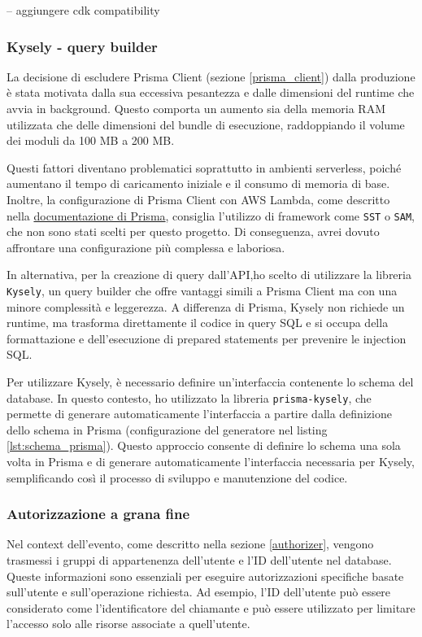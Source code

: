-- aggiungere cdk compatibility

\subsubsection{Kysely - query builder}
\label{Kysely}

\vspace{0,3cm}

La decisione di escludere Prisma Client (sezione \ref{prisma_client}) dalla produzione è stata motivata dalla sua eccessiva pesantezza e dalle dimensioni del runtime che avvia in background. Questo comporta un aumento sia della memoria RAM utilizzata che delle dimensioni del bundle di esecuzione, raddoppiando il volume dei moduli da 100 MB a 200 MB. 

Questi fattori diventano problematici soprattutto in ambienti serverless, poiché aumentano il tempo di caricamento iniziale e il consumo di memoria di base. Inoltre, la configurazione di Prisma Client con AWS Lambda, come descritto nella \href{https://www.prisma.io/docs/orm/prisma-client/deployment/serverless/deploy-to-aws-lambda}{documentazione di Prisma}, consiglia l'utilizzo di framework come \texttt{SST} o \texttt{SAM}, che non sono stati scelti per questo progetto. Di conseguenza, avrei dovuto affrontare una configurazione più complessa e laboriosa.

\vspace{0,3cm}

In alternativa, per la creazione di query dall'API,ho scelto di utilizzare la libreria \texttt{Kysely}, un query builder che offre vantaggi simili a Prisma Client ma con una minore complessità e leggerezza. A differenza di Prisma, Kysely non richiede un runtime, ma trasforma direttamente il codice in query SQL e si occupa della formattazione e dell'esecuzione di prepared statements per prevenire le injection SQL. 

Per utilizzare Kysely, è necessario definire un'interfaccia contenente lo schema del database. In questo contesto, ho utilizzato la libreria \texttt{prisma-kysely}, che permette di generare automaticamente l'interfaccia a partire dalla definizione dello schema in Prisma (configurazione del generatore nel listing \ref{lst:schema_prisma}). Questo approccio consente di definire lo schema una sola volta in Prisma e di generare automaticamente l'interfaccia necessaria per Kysely, semplificando così il processo di sviluppo e manutenzione del codice.


\subsubsection{Autorizzazione a grana fine}
\label{context_service}
Nel context dell'evento, come descritto nella sezione \ref{authorizer}, vengono trasmessi i gruppi di appartenenza dell'utente e l'ID dell'utente nel database. Queste informazioni sono essenziali per eseguire autorizzazioni specifiche basate sull'utente e sull'operazione richiesta. Ad esempio, l'ID dell'utente può essere considerato come l'identificatore del chiamante e può essere utilizzato per limitare l'accesso solo alle risorse associate a quell'utente.

